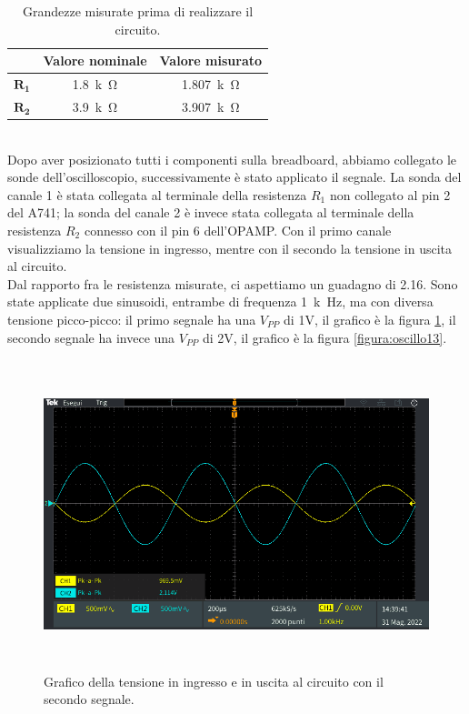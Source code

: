 \documentclass{report}
\begin{document}
\begin{table}[h]
	\centering
	\begin{tabular}{|c|c|c|}
	\cline{2-3} 
	\multicolumn{1}{c|}{} & \textbf{Valore nominale} & \textbf{Valore misurato}\\ 
		\hline
		$\mathbf{R_1}$& \SI{1.8}{k\ohm} & \SI{1.807}{k\ohm} \\ 
		\hline
		$\mathbf{R_2}$& \SI{3.9}{k\ohm} & \SI{3.907}{k\ohm} \\ 
		\hline
	\end{tabular}
\caption{Grandezze misurate prima di realizzare il circuito.}
\label{table:amplinv_comp}
\end{table}
\\Dopo aver posizionato tutti i componenti sulla breadboard, abbiamo collegato le sonde dell'oscilloscopio, successivamente è stato applicato il segnale. La sonda del canale 1 è stata collegata al terminale della resistenza $R_1$ non collegato al pin 2 del \textmu A741; la sonda del canale 2 è invece stata collegata al terminale della resistenza $R_2$ connesso con il pin 6 dell'OPAMP. Con il primo canale visualizziamo la tensione in ingresso, mentre con il secondo la tensione in uscita al circuito. 
\\\indent Dal rapporto fra le resistenza misurate, ci aspettiamo un guadagno di 2.16. Sono state applicate due sinusoidi, entrambe di frequenza \SI{1}{k\hertz}, ma con diversa tensione picco-picco: il primo segnale ha una $V_{PP}$ di 1V, il grafico è la figura \ref{figura:oscillo12}, il secondo segnale ha invece una $V_{PP}$ di 2V, il grafico è la figura \ref{figura:oscillo13}.
\begin{figure}[h]
\centering
\includegraphics[height=9cm]{immagini/oscillo12}
\caption{Grafico della tensione in ingresso e in uscita al circuito con il secondo segnale.}
\label{figura:oscillo12}
\end{figure}
\end{document}
